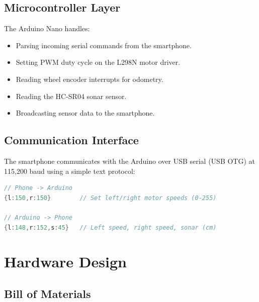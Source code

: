 \documentclass[12pt,a4paper]{article}
\begin{document}
\subsection{Microcontroller Layer}

The Arduino Nano handles:
\begin{itemize}
    \item Parsing incoming serial commands from the smartphone.
    \item Setting PWM duty cycle on the L298N motor driver.
    \item Reading wheel encoder interrupts for odometry.
    \item Reading the HC-SR04 sonar sensor.
    \item Broadcasting sensor data to the smartphone.
\end{itemize}

\subsection{Communication Interface}

The smartphone communicates with the Arduino over USB serial (USB OTG) at 115,200 baud using
a simple text protocol:

\begin{lstlisting}[language=C, caption=Serial communication protocol]
// Phone -> Arduino
{l:150,r:150}        // Set left/right motor speeds (0-255)

// Arduino -> Phone
{l:148,r:152,s:45}   // Left speed, right speed, sonar (cm)
\end{lstlisting}

\section{Hardware Design}
\label{sec:hardware}

\subsection{Bill of Materials}
\end{document}
